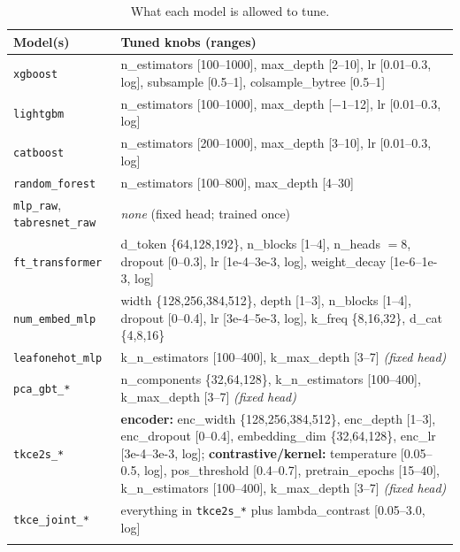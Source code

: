 \documentclass[11pt]{article}
\newcommand{\code}[1]{\texttt{#1}}
\begin{document}
\begin{longtable}{@{}p{3.4cm} p{9.4cm}@{}}
\toprule
\textbf{Model(s)} & \textbf{Tuned knobs (ranges)} \\
\midrule
\endhead
\code{xgboost} & n\_estimators [100–1000], max\_depth [2–10], lr [0.01–0.3, log], subsample [0.5–1], colsample\_bytree [0.5–1] \\
\code{lightgbm} & n\_estimators [100–1000], max\_depth [$-1$–12], lr [0.01–0.3, log] \\
\code{catboost} & n\_estimators [200–1000], max\_depth [3–10], lr [0.01–0.3, log] \\
\code{random\_forest} & n\_estimators [100–800], max\_depth [4–30] \\
\code{mlp\_raw}, \code{tabresnet\_raw} & \emph{none} (fixed head; trained once) \\
\code{ft\_transformer} & d\_token \{64,128,192\}, n\_blocks [1–4], n\_heads $=8$, dropout [0–0.3], lr [1e-4–3e-3, log], weight\_decay [1e-6–1e-3, log] \\
\code{num\_embed\_mlp} & width \{128,256,384,512\}, depth [1–3], n\_blocks [1–4], dropout [0–0.4], lr [3e-4–5e-3, log], k\_freq \{8,16,32\}, d\_cat \{4,8,16\} \\
\code{leafonehot\_mlp} & k\_n\_estimators [100–400], k\_max\_depth [3–7] \emph{(fixed head)} \\
\code{pca\_gbt\_*} & n\_components \{32,64,128\}, k\_n\_estimators [100–400], k\_max\_depth [3–7] \emph{(fixed head)} \\
\code{tkce2s\_*} & \textbf{encoder:} enc\_width \{128,256,384,512\}, enc\_depth [1–3], enc\_dropout [0–0.4], embedding\_dim \{32,64,128\}, enc\_lr [3e-4–3e-3, log]; \textbf{contrastive/kernel:} temperature [0.05–0.5, log], pos\_threshold [0.4–0.7], pretrain\_epochs [15–40], k\_n\_estimators [100–400], k\_max\_depth [3–7] \emph{(fixed head)} \\
\code{tkce\_joint\_*} & everything in \code{tkce2s\_*} plus lambda\_contrast [0.05–3.0, log] \\
\bottomrule
\caption{What each model is allowed to tune.}
\label{tab:spaces}
\end{longtable}

\end{document}
